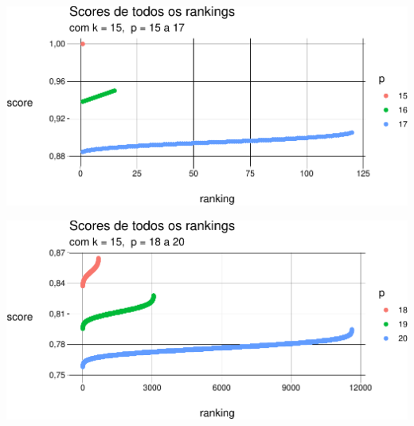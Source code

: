 \documentclass[
  letterpaper,
  DIV=11,
  numbers=noendperiod]{scrreprt}
\begin{document}
\begin{center}
\includegraphics[width=1\textwidth,height=\textheight]{usando-posicoes_files/figure-pdf/unnamed-chunk-8-1.pdf}
\end{center}

\begin{center}
\includegraphics[width=1\textwidth,height=\textheight]{usando-posicoes_files/figure-pdf/unnamed-chunk-9-1.pdf}
\end{center}
\end{document}
